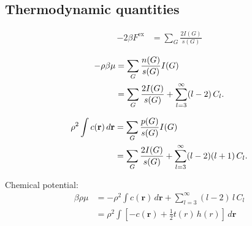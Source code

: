 \documentclass[aip,jcp,reprint,superscriptaddress]{revtex4-1}
\newcommand{\vct}[1]{\mathbf{#1}}
\providecommand{\vr}{} %
\renewcommand{\vr}{\vct{r}}
\newcommand{\supex}[1]{{#1}^{\mathrm{ex}}}
\newcommand{\Fex}{\supex{F}}
\begin{document}
\subsection*{Thermodynamic quantities}




%
\begin{align}
      -2\beta \Fex
  &=  \sum_G \frac{ 2 I(G) } { s(G) }
\label{eq:hncF}
\end{align}

%
\begin{align}
      -\rho \beta \mu
  &=  \sum_G \frac{ n(G) } { s(G) } I(G)
      \notag \\
  &=  \sum_G \frac{ 2 I(G) } { s(G) }
    + \sum_{l = 3}^\infty (l - 2) \, C_l.
\label{eq:hncmu}
\end{align}


%
\begin{align}
      \rho^2 \int c(\vr) \, d\vr
  &=  \sum_G \frac{ p(G) } { s(G) } I(G)
      \notag \\
  &=  \sum_G \frac{ 2 I(G) } { s(G) }
    + \sum_{l = 3}^\infty (l - 2) (l+1) \, C_l.
\label{eq:hncdmu}
\end{align}

Chemical potential:
%
\begin{align}
      \beta \rho \mu
  &= - \rho^2 \int c(\vr) \, d\vr
     + \sum_{l = 3}^\infty (l - 2) \, l \, C_l \\
  &= \rho^2 \int [-c(\vr) + \tfrac{1}{2} t(r) \, h(r)] \, d\vr
\label{eq:hncdmu}
\end{align}






\end{document}
